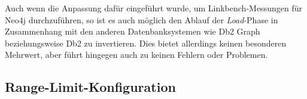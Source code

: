 Auch wenn die Anpassung dafür eingeführt wurde, um Linkbench-Messungen für Neo4j durchzuführen, so ist es auch möglich den Ablauf der \textit{Load}-Phase in Zusammenhang mit den anderen Datenbanksystemen wie Db2 Graph beziehungsweise Db2 zu invertieren. Dies bietet allerdings keinen besonderen Mehrwert, aber führt hingegen auch zu keinen Fehlern oder Problemen.  

\subsection{Range-Limit-Konfiguration}
